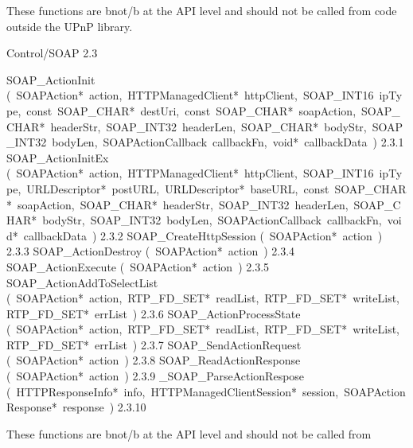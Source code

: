 \documentclass{article}
\begin{document}
\begin{cxxentry}
\begin{cxxentry}
\begin{cxxdoc}
These functions are \<b\>not\</b\> at the API level and should not be called from
code outside the UPnP library. 
\end{cxxdoc}
\end{cxxentry}
\begin{cxxentry}
{}
        {Control/SOAP}
        {}
        {}
        {2.3}
\begin{cxxnames}
        {SOAP\_ActionInit}
        {(\ SOAPAction*\ action,\ HTTPManagedClient*\ httpClient,\ SOAP\_INT16\ ipType,\ const\ SOAP\_CHAR*\ destUri,\ const\ SOAP\_CHAR*\ soapAction,\ SOAP\_CHAR*\ headerStr,\ SOAP\_INT32\ headerLen,\ SOAP\_CHAR*\ bodyStr,\ SOAP\_INT32\ bodyLen,\ SOAPActionCallback\ callbackFn,\ void*\ callbackData\ )}
        {}
        {2.3.1}
        {SOAP\_ActionInitEx}
        {(\ SOAPAction*\ action,\ HTTPManagedClient*\ httpClient,\ SOAP\_INT16\ ipType,\ URLDescriptor*\ postURL,\ URLDescriptor*\ baseURL,\ const\ SOAP\_CHAR*\ soapAction,\ SOAP\_CHAR*\ headerStr,\ SOAP\_INT32\ headerLen,\ SOAP\_CHAR*\ bodyStr,\ SOAP\_INT32\ bodyLen,\ SOAPActionCallback\ callbackFn,\ void*\ callbackData\ )}
        {}
        {2.3.2}
        {SOAP\_CreateHttpSession}
        {(\ SOAPAction*\ action\ )}
        {}
        {2.3.3}
        {SOAP\_ActionDestroy}
        {(\ SOAPAction*\ action\ )}
        {}
        {2.3.4}
        {SOAP\_ActionExecute}
        {(\ SOAPAction*\ action\ )}
        {}
        {2.3.5}
        {SOAP\_ActionAddToSelectList}
        {(\ SOAPAction*\ action,\ RTP\_FD\_SET*\ readList,\ RTP\_FD\_SET*\ writeList,\ RTP\_FD\_SET*\ errList\ )}
        {}
        {2.3.6}
        {SOAP\_ActionProcessState}
        {(\ SOAPAction*\ action,\ RTP\_FD\_SET*\ readList,\ RTP\_FD\_SET*\ writeList,\ RTP\_FD\_SET*\ errList\ )}
        {}
        {2.3.7}
        {SOAP\_SendActionRequest}
        {(\ SOAPAction*\ action\ )}
        {}
        {2.3.8}
        {SOAP\_ReadActionResponse}
        {(\ SOAPAction*\ action\ )}
        {}
        {2.3.9}
        {\_SOAP\_ParseActionRespose}
        {(\ HTTPResponseInfo*\ info,\ HTTPManagedClientSession*\ session,\ SOAPActionResponse*\ response\ )}
        {}
        {2.3.10}
\end{cxxnames}
\begin{cxxdoc}
These functions are \<b\>not\</b\> at the API level and should not be called from

\end{cxxdoc}
\end{cxxentry}
\end{cxxentry}
\end{document}
